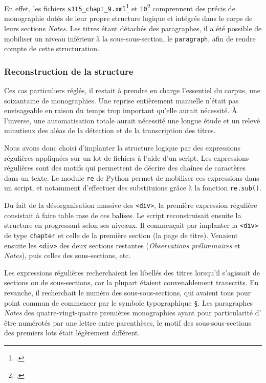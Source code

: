 En effet, les fichiers \texttt{s1t5\_chapt\_9.xml}\footcite{mono041a} et \texttt{10}\footcite{mono042a} comprennent des précis de monographie dotés de leur propre structure logique et intégrés dans le corps de leurs sections \textit{Notes}. Les titres étant détachés des paragraphes, il a été possible de mobiliser un niveau inférieur à la sous-sous-section, le \texttt{paragraph}, afin de rendre compte de cette structuration.

\subsubsection{Reconstruction de la structure}

Ces cas particuliers réglés, il restait à prendre en charge l'essentiel du corpus, \cad{} une soixantaine de monographies. Une reprise entièrement manuelle n'était pas envisageable en raison du temps trop important qu'elle aurait nécessité. À l'inverse, une automatisation totale aurait nécessité une longue étude et un relevé minutieux des aléas de la détection et de la transcription des titres.

Nous avons donc choisi d'implanter la structure logique par des expressions régulières appliquées sur un lot de fichiers à l'aide d'un script. Les expressions régulières sont des motifs qui permettent de décrire des chaînes de caractères dans un texte. Le module \texttt{re} de Python permet de mobiliser ces expressions dans un script, et notamment d'effectuer des substituions grâce à la fonction \texttt{re.sub()}.

Du fait de la désorganisation massive des \texttt{<div>}, la première expression régulière consistait à faire table rase de ces balises. Le script reconstruisait ensuite la structure en progressant selon ses niveaux. Il commençait par implanter la \texttt{<div>} de type \texttt{chapter} et celle de la première section (la page de titre). Venaient ensuite les \texttt{<div>} des deux sections restantes (\textit{Observations préliminaires} et \textit{Notes}), puis celles des sous-sections, etc.

Les expressions régulières recherchaient les libellés des titres lorsqu'il s'agissait de sections ou de sous-sections, car la plupart étaient convenablement transcrits. En revanche, il recherchait le numéro des sous-sous-sections, qui avaient tous pour point commun de commencer par le symbole typographique \texttt{§}. Les paragraphes \textit{Notes} des quatre-vingt-quatre premières monographies ayant pour particularité d'
être numérotés par une lettre entre parenthèses, le motif des sous-sous-sections des premiers lots était légèrement différent.

